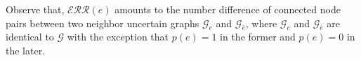Observe that, $\mathcal{ERR}(e)$ amounts to the number difference of connected node pairs between two neighbor uncertain graphs $\mathcal{G}_{e}$ and $\mathcal{G}_{\bar{e}}$, 
where $\mathcal{G}_{e}$ and $\mathcal{G}_{\bar{e}}$ are identical to $\mathcal{G}$ with the exception that $p(e)=1$ in the former and $p(e)=0$ in the later. 
















